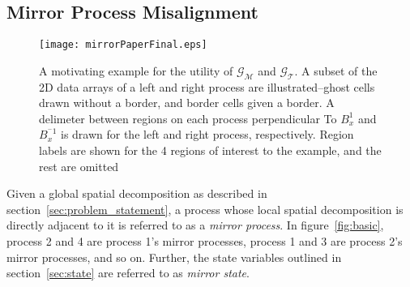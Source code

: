 \subsection{Mirror Process Misalignment}

\begin{figure}[h]
    \centering
    \texttt{[image: mirrorPaperFinal.eps]}
    \caption{A motivating example for the utility of $\mathcal{G_M}$ and $\mathcal{G_T}$.  A subset of the
    2D data arrays of a left and right process are illustrated--ghost cells drawn without a border, and
    border cells given a border.  A delimeter between regions on each process perpendicular To
     $B_x^{1}$ and $B_x^{^-1}$ is drawn for the left and right process, respectively.  Region labels
     are shown for the 4 regions of interest to the example, and the rest are omitted}
    \label{fig:mirror_motivation}
\end{figure}

Given a global spatial decomposition as described in section~\ref{sec:problem_statement}, a
process whose local spatial decomposition is directly adjacent to it is referred to as a
{\it mirror process}.  In figure~\ref{fig:basic}, process 2 and 4 are process 1's mirror
processes, process 1 and 3 are process 2's mirror processes, and so on.  Further,
the state variables outlined in section~\ref{sec:state} are referred to as
{\it mirror state}.

